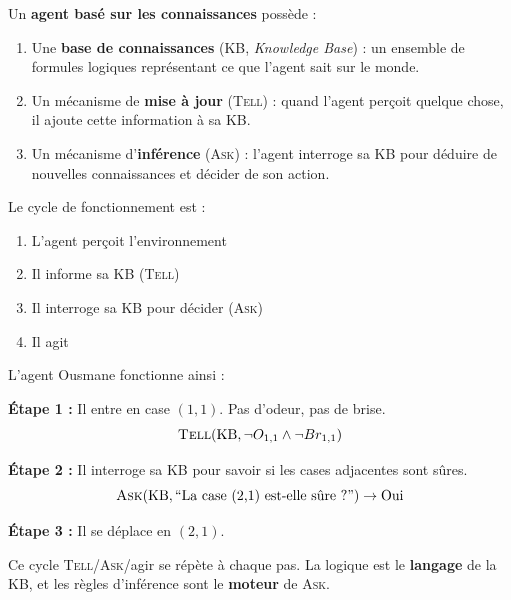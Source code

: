 \documentclass[11pt,a4paper]{article}
\begin{document}
\begin{definitionbox}
Un \textbf{agent basé sur les connaissances} possède :
\begin{enumerate}
    \item Une \textbf{base de connaissances} (KB, \textit{Knowledge Base}) : un ensemble de formules logiques représentant ce que l'agent sait sur le monde.
    \item Un mécanisme de \textbf{mise à jour} (\textsc{Tell}) : quand l'agent perçoit quelque chose, il ajoute cette information à sa KB.
    \item Un mécanisme d'\textbf{inférence} (\textsc{Ask}) : l'agent interroge sa KB pour déduire de nouvelles connaissances et décider de son action.
\end{enumerate}

Le cycle de fonctionnement est :
\begin{enumerate}
    \item L'agent perçoit l'environnement
    \item Il informe sa KB (\textsc{Tell})
    \item Il interroge sa KB pour décider (\textsc{Ask})
    \item Il agit
\end{enumerate}
\end{definitionbox}

\begin{exemplebox}
L'agent Ousmane fonctionne ainsi :

\textbf{Étape 1 :} Il entre en case $(1,1)$. Pas d'odeur, pas de brise.
$$\textsc{Tell}(\text{KB}, \neg O_{1,1} \land \neg Br_{1,1})$$

\textbf{Étape 2 :} Il interroge sa KB pour savoir si les cases adjacentes sont sûres.
$$\textsc{Ask}(\text{KB}, \text{``La case (2,1) est-elle sûre ?''}) \to \text{Oui}$$

\textbf{Étape 3 :} Il se déplace en $(2,1)$.

Ce cycle \textsc{Tell}/\textsc{Ask}/agir se répète à chaque pas. La logique est le \textbf{langage} de la KB, et les règles d'inférence sont le \textbf{moteur} de \textsc{Ask}.
\end{exemplebox}
\end{document}
